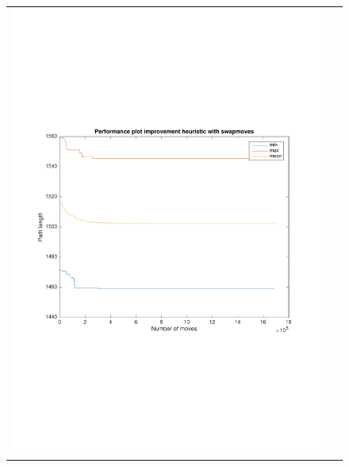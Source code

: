 \documentclass[a4paper, 11pt]{scrartcl}
\begin{document}
\begin{figure}[!ht]
  \centering
  \begin{tabular}{cc}
    \includegraphics[scale=0.4, trim={3cm 6cm 1cm 6cm}]{../figures/perfPlot_swap.pdf} & 

\end{tabular}
\end{figure}
\end{document}

